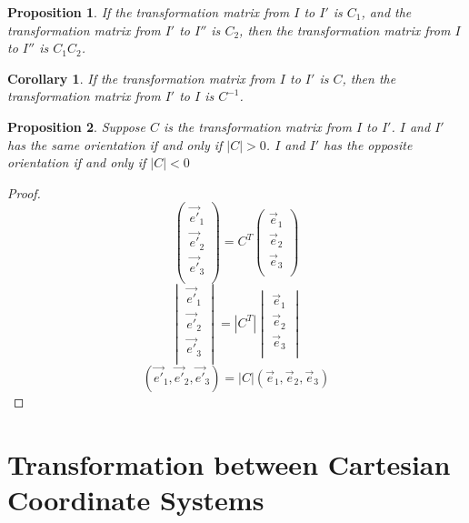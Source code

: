\documentclass[onecolumn]{ctexart}
\newtheorem{proposition}{Proposition}
\newtheorem{corollary}{Corollary}
\begin{document}
\begin{proposition}
  If the transformation matrix from $I$ to $I'$ is $C_1$, and the transformation 
  matrix from $I'$ to $I''$ is $C_2$, then the transformation matrix from $I$ to 
  $I''$ is $C_1C_2$.
\end{proposition}

\begin{corollary}
  If the transformation matrix from $I$ to $I'$ is $C$, then the transformation 
  matrix from $I'$ to $I$ is $C^{-1}$.
\end{corollary}

\begin{proposition}
  Suppose $C$ is the transformation matrix from $I$ to $I'$. $I$ and $I'$ has 
  the same orientation if and only if $|C| > 0$. $I$ and $I'$ has the opposite 
  orientation if and only if $|C| < 0$
\end{proposition}
\begin{proof}
  \[
    \begin{pmatrix}
      \vec{e'}_1 \\
      \vec{e'}_2 \\
      \vec{e'}_3 \\
    \end{pmatrix} = C^T 
    \begin{pmatrix}
      \vec{e}_1 \\
      \vec{e}_2 \\
      \vec{e}_3 \\
    \end{pmatrix}
  \]
  \[
    \begin{vmatrix}
      \vec{e'}_1 \\
      \vec{e'}_2 \\
      \vec{e'}_3 \\
    \end{vmatrix} = |C^T|
    \begin{vmatrix}
      \vec{e}_1 \\
      \vec{e}_2 \\
      \vec{e}_3 \\
    \end{vmatrix}
  \]
  \[
    (\vec{e'}_1, \vec{e'}_2, \vec{e'}_3) = |C| (\vec{e}_1, \vec{e}_2, \vec{e}_3)
  \]
\end{proof}

\section{Transformation between Cartesian Coordinate Systems}
\end{document}

